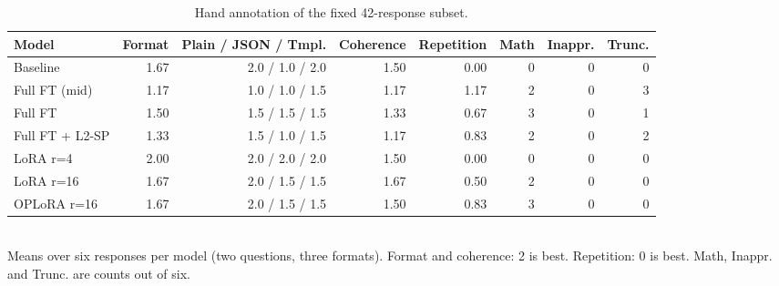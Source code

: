 \begin{table}[t]
\centering
\scriptsize
\begin{tabular}{lrrrrrrr}
\toprule
Model & Format & Plain / JSON / Tmpl. & Coherence & Repetition & Math & Inappr. & Trunc. \\
\midrule
Baseline & 1.67 & 2.0 / 1.0 / 2.0 & 1.50 & 0.00 & 0 & 0 & 0 \\
Full FT (mid) & 1.17 & 1.0 / 1.0 / 1.5 & 1.17 & 1.17 & 2 & 0 & 3 \\
Full FT & 1.50 & 1.5 / 1.5 / 1.5 & 1.33 & 0.67 & 3 & 0 & 1 \\
Full FT + L2-SP & 1.33 & 1.5 / 1.0 / 1.5 & 1.17 & 0.83 & 2 & 0 & 2 \\
LoRA r=4 & 2.00 & 2.0 / 2.0 / 2.0 & 1.50 & 0.00 & 0 & 0 & 0 \\
LoRA r=16 & 1.67 & 2.0 / 1.5 / 1.5 & 1.67 & 0.50 & 2 & 0 & 0 \\
OPLoRA r=16 & 1.67 & 2.0 / 1.5 / 1.5 & 1.50 & 0.83 & 3 & 0 & 0 \\
\bottomrule
\end{tabular}
\\[2pt]{\footnotesize Means over six responses per model (two questions, three formats). Format and coherence: 2 is best. Repetition: 0 is best. Math, Inappr. and Trunc. are counts out of six.}
\caption{Hand annotation of the fixed 42-response subset.}
\label{tab:t1-annotation}
\end{table}
